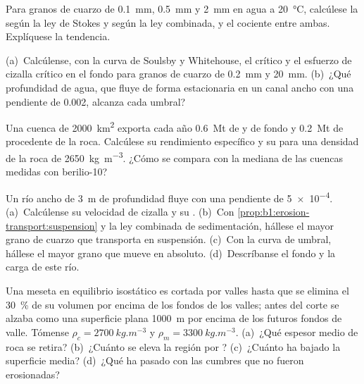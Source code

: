 \begin{exercise}[$\star\star$]\label{exo:b1:erosion-transport:7}
Para granos de cuarzo de \qty{0.1}{mm}, \qty{0.5}{mm} y \qty{2}{mm} en agua a \qty{20}{\celsius}, calcúlese la  según la ley
de Stokes y según la ley combinada, y el cociente entre ambas. Explíquese la tendencia.
\end{exercise}

\begin{exercise}[$\star\star$]\label{exo:b1:erosion-transport:8}
(a)~Calcúlense, con la curva de Soulsby y Whitehouse, el  crítico y el esfuerzo de cizalla crítico en el fondo para granos de cuarzo
de \qty{0.2}{mm} y \qty{20}{mm}. (b)~¿Qué profundidad de agua, que fluye de forma estacionaria en un canal ancho con una pendiente de \num{0.002}, alcanza cada umbral?
\end{exercise}

\begin{exercise}[$\star\star$]\label{exo:b1:erosion-transport:9}
Una cuenca de \qty{2000}{km^2} exporta cada año \qty{0.6}{Mt} de  y de fondo y \qty{0.2}{Mt} de  procedente de la roca.
Calcúlese su rendimiento específico y su  para una densidad de la roca de \qty{2650}{kg.m^{-3}}. ¿Cómo se compara con la mediana de las
cuencas medidas con berilio-10?
\end{exercise}

\begin{exercise}[$\star\star\star$]\label{exo:b1:erosion-transport:10}
Un río ancho de \qty{3}{m} de profundidad fluye con una pendiente de \num{5e-4}. (a)~Calcúlense su velocidad de cizalla y su .
(b)~Con \cref{prop:b1:erosion-transport:suspension} y la ley combinada de sedimentación, hállese el mayor grano de cuarzo que transporta en suspensión. (c)~Con la
curva de umbral, hállese el mayor grano que mueve en absoluto. (d)~Descríbanse el fondo y la carga de este río.
\end{exercise}

\begin{exercise}[$\star\star\star$]\label{exo:b1:erosion-transport:11}
Una meseta en equilibrio isostático es cortada por valles hasta que se elimina el \qty{30}{\percent} de su volumen por encima de los fondos de los valles; antes
del corte se alzaba como una superficie plana \qty{1000}{m} por encima de los futuros fondos de valle. Tómense $\rho_c = \qty{2700}{kg.m^{-3}}$ y $\rho_m = \qty{3300}{kg.m^{-3}}$.
(a)~¿Qué espesor medio de roca se retira? (b)~¿Cuánto se eleva la región por ? (c)~¿Cuánto ha bajado la superficie media? (d)~¿Qué ha pasado con las cumbres
que no fueron erosionadas?
\end{exercise}

